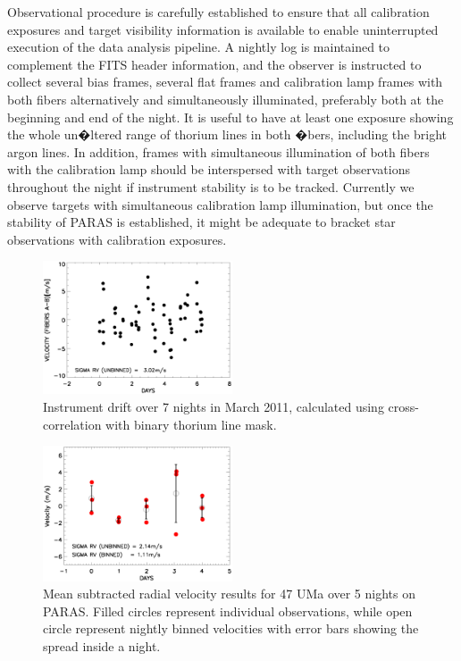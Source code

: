 \documentclass[12pt,preprint]{emulateapj}
\begin{document}
Observational procedure is carefully established to ensure that all calibration exposures and target visibility information is available to enable uninterrupted execution of the data analysis pipeline. A nightly log is maintained to complement the FITS header information, and the observer is instructed to collect several bias frames, several flat frames and calibration lamp frames with both fibers alternatively and simultaneously illuminated, preferably both at the beginning and end of the night. It is useful to have at least one exposure showing the whole un�ltered range of thorium lines in both �bers, including the bright argon lines. In addition, frames with simultaneous illumination of both fibers with the calibration lamp should be interspersed with target observations throughout the night if instrument stability is to be tracked. Currently we observe targets with simultaneous calibration lamp illumination, but once the stability of PARAS is established, it might be adequate to bracket star observations with calibration exposures.

\begin{figure}[htbp] %
   \centering
   \includegraphics[width=0.5\textwidth]{drift_paper.eps} 
    \caption{Instrument drift over 7 nights in March 2011, calculated using cross-correlation with binary thorium line mask.}
   \label{fig:drift}
\end{figure}

\begin{figure}[htbp] %
   \centering
   \includegraphics[width=0.5\textwidth]{47uma_orbit_paper.eps} 
    \caption{Mean subtracted radial velocity results for 47 UMa over 5 nights on PARAS. Filled circles represent individual observations, while open circle represent nightly binned velocities with error bars showing the spread inside a night.}
   \label{fig:47uma}
\end{figure}
\end{document}
